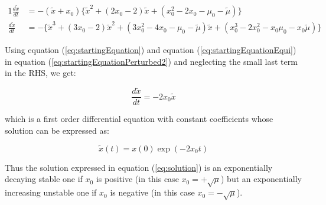 \documentclass{article}
\begin{document}
	\begin{alignat}{1}
		\label{eq:startingEquationPerturbed3}
		\frac{d\tilde{x}}{dt} &= -(\tilde{x}+x_0)\{\tilde{x}^2 + (2x_0-2)\tilde{x} + (x_0^2-2x_0-\mu_0-\tilde{\mu})\} \nonumber \\		
		\frac{d\tilde{x}}{dt} &= -\{\tilde{x}^3 + (3x_0-2)\tilde{x}^2 + (3x_0^2-4x_0-\mu_0-\tilde{\mu})\tilde{x} + (x_0^3 -2x_0^2 -x_0\mu_0 -x_0\tilde{\mu})\}
	\end{alignat}	
	
	Using equation (\ref{eq:startingEquation}) and equation (\ref{eq:startingEquationEqui}) in equation (\ref{eq:startingEquationPerturbed2}) and neglecting the small last term in the RHS, we get:
	
	\begin{equation}
		\frac{d\tilde x}{dt} = -2x_0\tilde x
	\end{equation}
	
	which is a first order differential equation with constant coefficients whose solution can be expressed as:
	
	\begin{equation}
		\label{eq:solution}
		\tilde{x}(t) = x(0)\exp{(-2x_0t)} 
	\end{equation}
	
	Thus the solution expressed in equation (\ref{eq:solution}) is an exponentially decaying stable one if $x_0$ is positive (in this case $x_0 = +\sqrt{\mu}$) but an exponentially increasing unstable one if $x_0$ is negative (in this case $x_0 = -\sqrt{\mu}$).
\end{document}
